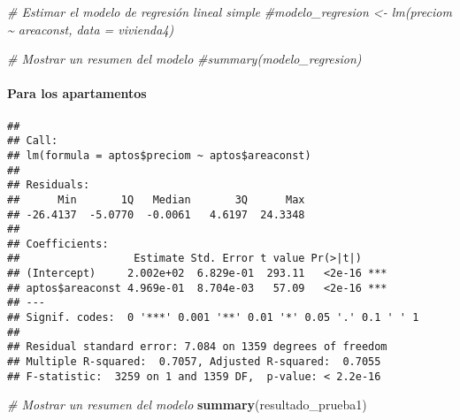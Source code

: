 \documentclass[
]{article}
\newenvironment{Shaded}{\begin{snugshade}}{\end{snugshade}}
\newcommand{\CommentTok}[1]{\textcolor[rgb]{0.56,0.35,0.01}{\textit{#1}}}
\newcommand{\FunctionTok}[1]{\textcolor[rgb]{0.13,0.29,0.53}{\textbf{#1}}}
\newcommand{\NormalTok}[1]{#1}
\newcommand{\OtherTok}[1]{\textcolor[rgb]{0.56,0.35,0.01}{#1}}
\newcommand{\SpecialCharTok}[1]{\textcolor[rgb]{0.81,0.36,0.00}{\textbf{#1}}}
\begin{document}
\begin{Shaded}
\begin{Highlighting}[]
\CommentTok{\# Estimar el modelo de regresión lineal simple}
\CommentTok{\#modelo\_regresion \textless{}{-} lm(preciom \textasciitilde{} areaconst, data = vivienda4)}

\CommentTok{\# Mostrar un resumen del modelo}
\CommentTok{\#summary(modelo\_regresion)}
\end{Highlighting}
\end{Shaded}

\paragraph{\texorpdfstring{\textbf{Para los
apartamentos}}{Para los apartamentos}}\label{para-los-apartamentos}

\begin{Shaded}
\end{Shaded}

\begin{verbatim}
## 
## Call:
## lm(formula = aptos$preciom ~ aptos$areaconst)
## 
## Residuals:
##      Min       1Q   Median       3Q      Max 
## -26.4137  -5.0770  -0.0061   4.6197  24.3348 
## 
## Coefficients:
##                  Estimate Std. Error t value Pr(>|t|)    
## (Intercept)     2.002e+02  6.829e-01  293.11   <2e-16 ***
## aptos$areaconst 4.969e-01  8.704e-03   57.09   <2e-16 ***
## ---
## Signif. codes:  0 '***' 0.001 '**' 0.01 '*' 0.05 '.' 0.1 ' ' 1
## 
## Residual standard error: 7.084 on 1359 degrees of freedom
## Multiple R-squared:  0.7057, Adjusted R-squared:  0.7055 
## F-statistic:  3259 on 1 and 1359 DF,  p-value: < 2.2e-16
\end{verbatim}

\begin{Shaded}
\begin{Highlighting}[]
\CommentTok{\# Mostrar un resumen del modelo}
\FunctionTok{summary}\NormalTok{(resultado\_prueba1)}
\end{Highlighting}
\end{Shaded}
\end{document}
